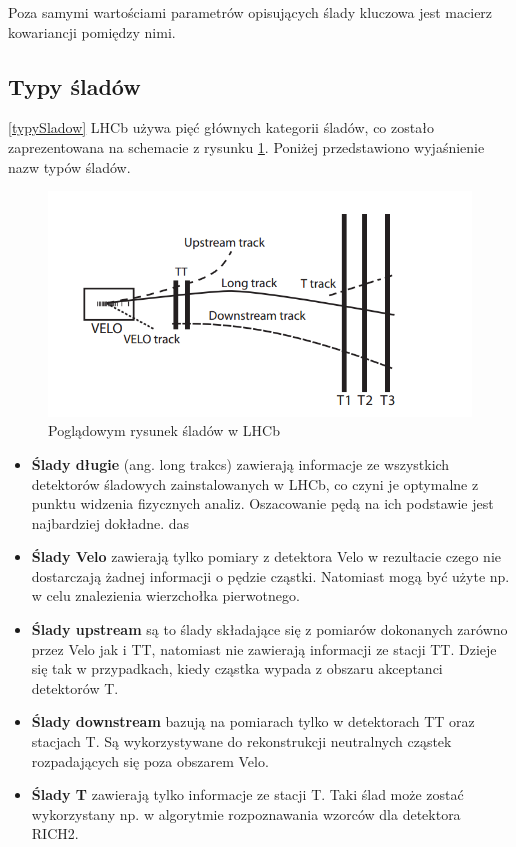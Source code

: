 Poza samymi wartościami parametrów opisujących ślady kluczowa jest macierz kowariancji pomiędzy nimi.

\subsection{Typy śladów}
\ref{typySladow}
LHCb używa pięć głównych kategorii śladów, co zostało zaprezentowana na schemacie z rysunku \ref{slady}. Poniżej przedstawiono wyjaśnienie nazw typów śladów.
\begin{figure}[h]
  \centering
  \includegraphics[scale=0.7]{rozdzial3/tracks.png}
  \caption{Poglądowym rysunek śladów w LHCb \cite{trackDefinition}}
  \label{slady}
\end{figure}
  
\begin{itemize}
\item \textbf{Ślady długie} (ang. long trakcs) zawierają informacje ze wszystkich detektorów śladowych zainstalowanych w LHCb, co czyni je optymalne z punktu widzenia fizycznych analiz. Oszacowanie pędą na ich podstawie jest najbardziej dokładne. das
\item \textbf{Ślady Velo} zawierają tylko pomiary z detektora Velo w rezultacie czego nie dostarczają żadnej informacji o pędzie cząstki. Natomiast mogą być użyte np. w celu znalezienia wierzchołka pierwotnego. 
\item \textbf{Ślady upstream} są to ślady składające się z pomiarów dokonanych zarówno przez Velo jak i TT, natomiast nie zawierają informacji ze stacji TT. Dzieje się tak w przypadkach, kiedy cząstka wypada z obszaru akceptanci detektorów T.   
\item \textbf{Ślady downstream} bazują na pomiarach tylko w detektorach TT oraz stacjach T. Są wykorzystywane do rekonstrukcji neutralnych cząstek rozpadających się poza obszarem Velo. 
\item \textbf{Ślady T}  zawierają tylko informacje ze stacji T. Taki ślad może zostać wykorzystany np. w algorytmie rozpoznawania wzorców dla detektora RICH2. 
\end{itemize}
